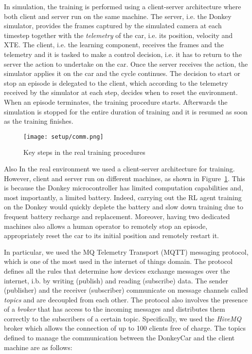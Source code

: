 In simulation, the training is performed using a client-server architecture where both client and server run on the same machine. The server, i.e. the Donkey simulator, provides the frames captured by the simulated camera at each timestep together with the \textit{telemetry} of the car, i.e. its position, velocity and XTE. The client, i.e. the learning component, receives the frames and the telemetry and it is tasked to make a control decision, i.e. it has to return to the server the action to undertake on the car. Once the server receives the action, the simulator applies it on the car and the cycle continues. The decision to start or stop an episode is delegated to the client, which according to the telemetry received by the simulator at each step, decides when to reset the environment. When an episode terminates, the training procedure starts. Afterwards the simulation is stopped for the entire duration of training and it is resumed as soon as the training finishes.

\begin{figure}[h]
	\begin{center}
		\texttt{[image: setup/comm.png]}
	\end{center}
	\caption{Key steps in the real training procedures}
	\label{fig:comunication}
\end{figure}

Also In the real environment we used a client-server architecture for training. However, client and server run on different machines, as shown in Figure~\ref{fig:comunication}. This is because the Donkey microcontroller has limited computation capabilities and, most importantly, a limited battery. Indeed, carrying out the RL agent training on the Donkey would quickly deplete the battery and slow down training due to frequent battery recharge and replacement. Moreover, having two dedicated machines also allows a human operator to remotely stop an episode, appropriately reset the car to its initial position and remotely restart it.

In particular, we used the MQ Telemetry Transport (MQTT) messaging protocol, which is one of the most used in the internet of things domain. The protocol defines all the rules that determine how devices exchange messages over the internet, i.b. by writing (publish) and reading (subscribe) data. The sender (publisher) and the receiver (subscriber) communicate on message channels called \textit{topics} and are decoupled from each other. The protocol also involves the presence of a \textit{broker} that has access to the incoming messages and distributes them correctly to the subscribers of a certain topic. Specifically, we used the \textit{HiveMQ} broker which allows the connection of up to 100 clients free of charge. The topics defined to manage the communication between the DonkeyCar and the client machine are as follows:

